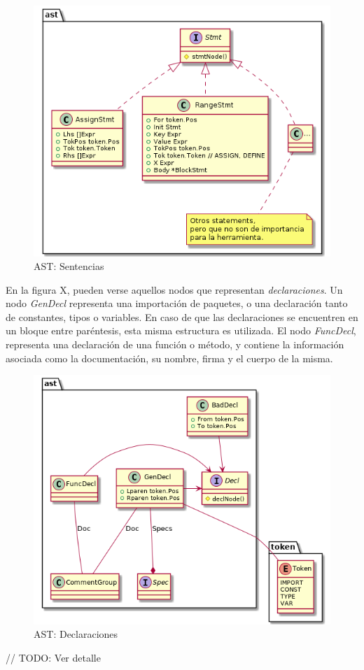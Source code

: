 \begin{figure}[H]
  \includegraphics[width=12cm]{implementation/ast_statements.png}
  \centering
  \caption{AST: Sentencias}
\end{figure}

En la figura X, pueden verse aquellos nodos que representan \textit{declaraciones}.
Un nodo \textit{GenDecl} representa una importación de paquetes, o una declaración tanto de
constantes, tipos o variables.
En caso de que las declaraciones se encuentren en un bloque entre paréntesis, esta misma
estructura es utilizada.
El nodo \textit{FuncDecl}, representa una declaración de una función o método, y contiene
la información asociada como la documentación, su nombre, firma y el cuerpo de la misma.

\begin{figure}[H]
  \includegraphics[width=12cm]{implementation/ast_decls.png}
  \centering
  \caption{AST: Declaraciones}
\end{figure}
// TODO: Ver detalle

